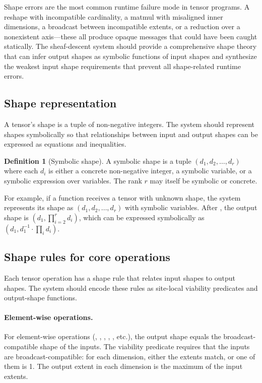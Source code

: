 \documentclass[11pt]{report}
\DeclareRobustCommand{\py}[1]{\texttt{\detokenize{#1}}}
\theoremstyle{definition}
\newtheorem{definition}{Definition}[section]
\theoremstyle{plain}
\begin{document}
Shape errors are the most common runtime failure mode in tensor programs. A
reshape with incompatible cardinality, a matmul with misaligned inner
dimensions, a broadcast between incompatible extents, or a reduction over
a nonexistent axis---these all produce opaque \py{RuntimeError} messages that
could have been caught statically. The sheaf-descent system should provide a
comprehensive shape theory that can infer output shapes as symbolic functions
of input shapes and synthesize the weakest input shape requirements that
prevent all shape-related runtime errors.

\subsection{Shape representation}

A tensor's shape is a tuple of non-negative integers. The system should
represent shapes symbolically so that relationships between input and output
shapes can be expressed as equations and inequalities.

\begin{definition}[Symbolic shape]
A symbolic shape is a tuple $(d_1, d_2, \ldots, d_r)$ where each $d_i$ is
either a concrete non-negative integer, a symbolic variable, or a symbolic
expression over variables. The rank $r$ may itself be symbolic or concrete.
\end{definition}

For example, if a function receives a tensor \py{x} with unknown shape, the
system represents its shape as $(d_1, d_2, \ldots, d_r)$ with symbolic
variables. After \py{y = x.view(d_1, -1)}, the output shape is
$(d_1, \prod_{i=2}^{r} d_i)$, which can be expressed symbolically as
$(d_1, d_1^{-1} \cdot \prod_i d_i)$.

\subsection{Shape rules for core operations}

Each tensor operation has a shape rule that relates input shapes to output
shapes. The system should encode these rules as site-local viability predicates
and output-shape functions.

\paragraph{Element-wise operations.}
For element-wise operations (\py{+}, \py{-}, \py{*}, \py{/}, \py{torch.relu},
etc.), the output shape equals the broadcast-compatible shape of the inputs.
The viability predicate requires that the inputs are broadcast-compatible: for
each dimension, either the extents match, or one of them is 1. The output
extent in each dimension is the maximum of the input extents.
\end{document}
